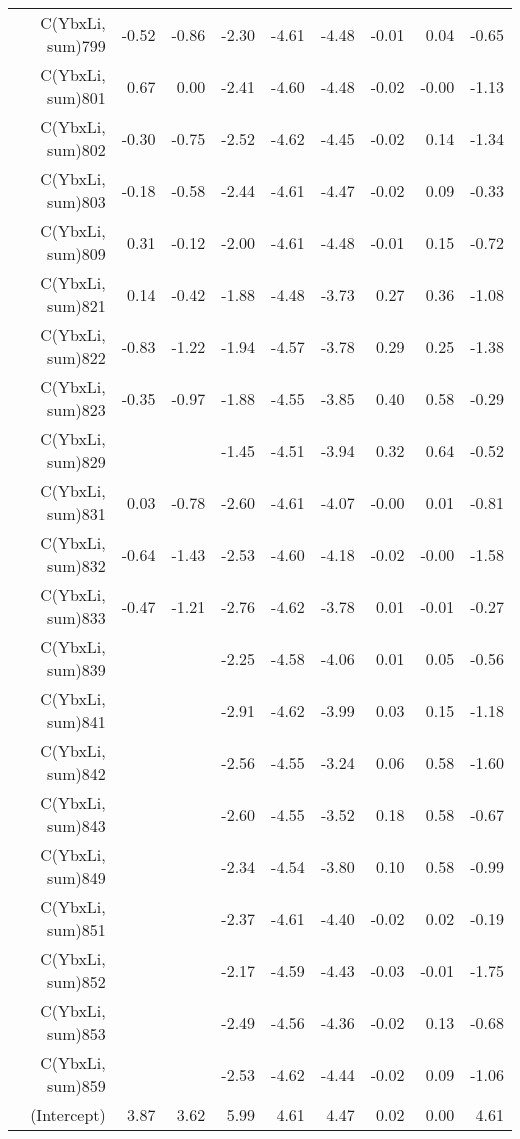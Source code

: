 \begin{table}[p]
\begin{tabular}{rrrrrrrrr}
  C(YbxLi, sum)799 & -0.52 & -0.86 & -2.30 & -4.61 & -4.48 & -0.01 & 0.04 & -0.65 \\ 
  C(YbxLi, sum)801 & 0.67 & 0.00 & -2.41 & -4.60 & -4.48 & -0.02 & -0.00 & -1.13 \\ 
  C(YbxLi, sum)802 & -0.30 & -0.75 & -2.52 & -4.62 & -4.45 & -0.02 & 0.14 & -1.34 \\ 
  C(YbxLi, sum)803 & -0.18 & -0.58 & -2.44 & -4.61 & -4.47 & -0.02 & 0.09 & -0.33 \\ 
  C(YbxLi, sum)809 & 0.31 & -0.12 & -2.00 & -4.61 & -4.48 & -0.01 & 0.15 & -0.72 \\ 
  C(YbxLi, sum)821 & 0.14 & -0.42 & -1.88 & -4.48 & -3.73 & 0.27 & 0.36 & -1.08 \\ 
  C(YbxLi, sum)822 & -0.83 & -1.22 & -1.94 & -4.57 & -3.78 & 0.29 & 0.25 & -1.38 \\ 
  C(YbxLi, sum)823 & -0.35 & -0.97 & -1.88 & -4.55 & -3.85 & 0.40 & 0.58 & -0.29 \\ 
  C(YbxLi, sum)829 &  &  & -1.45 & -4.51 & -3.94 & 0.32 & 0.64 & -0.52 \\ 
  C(YbxLi, sum)831 & 0.03 & -0.78 & -2.60 & -4.61 & -4.07 & -0.00 & 0.01 & -0.81 \\ 
  C(YbxLi, sum)832 & -0.64 & -1.43 & -2.53 & -4.60 & -4.18 & -0.02 & -0.00 & -1.58 \\ 
  C(YbxLi, sum)833 & -0.47 & -1.21 & -2.76 & -4.62 & -3.78 & 0.01 & -0.01 & -0.27 \\ 
  C(YbxLi, sum)839 &  &  & -2.25 & -4.58 & -4.06 & 0.01 & 0.05 & -0.56 \\ 
  C(YbxLi, sum)841 &  &  & -2.91 & -4.62 & -3.99 & 0.03 & 0.15 & -1.18 \\ 
  C(YbxLi, sum)842 &  &  & -2.56 & -4.55 & -3.24 & 0.06 & 0.58 & -1.60 \\ 
  C(YbxLi, sum)843 &  &  & -2.60 & -4.55 & -3.52 & 0.18 & 0.58 & -0.67 \\ 
  C(YbxLi, sum)849 &  &  & -2.34 & -4.54 & -3.80 & 0.10 & 0.58 & -0.99 \\ 
  C(YbxLi, sum)851 &  &  & -2.37 & -4.61 & -4.40 & -0.02 & 0.02 & -0.19 \\ 
  C(YbxLi, sum)852 &  &  & -2.17 & -4.59 & -4.43 & -0.03 & -0.01 & -1.75 \\ 
  C(YbxLi, sum)853 &  &  & -2.49 & -4.56 & -4.36 & -0.02 & 0.13 & -0.68 \\ 
  C(YbxLi, sum)859 &  &  & -2.53 & -4.62 & -4.44 & -0.02 & 0.09 & -1.06 \\ 
  (Intercept) & 3.87 & 3.62 & 5.99 & 4.61 & 4.47 & 0.02 & 0.00 & 4.61 \\ 
   \hline
\end{tabular}
\end{table}

